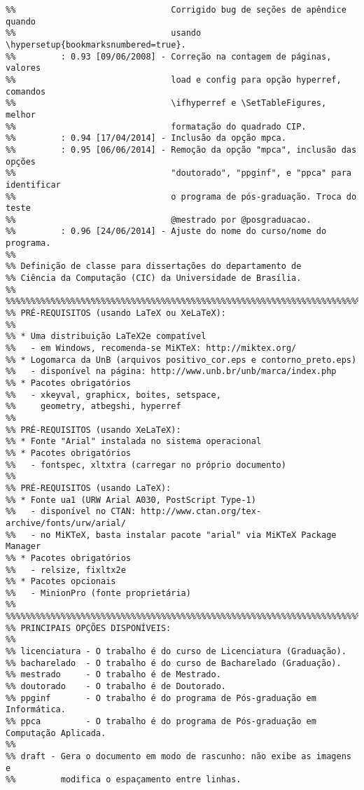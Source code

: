 \begin{verbatim}
%%                               Corrigido bug de seções de apêndice quando
%%                               usando \hypersetup{bookmarksnumbered=true}.
%%         : 0.93 [09/06/2008] - Correção na contagem de páginas, valores
%%                               load e config para opção hyperref, comandos
%%                               \ifhyperref e \SetTableFigures, melhor
%%                               formatação do quadrado CIP. 
%%         : 0.94 [17/04/2014] - Inclusão da opção mpca. 
%%         : 0.95 [06/06/2014] - Remoção da opção "mpca", inclusão das opções
%%                               "doutorado", "ppginf", e "ppca" para identificar
%%                               o programa de pós-graduação. Troca do teste 
%%                               @mestrado por @posgraduacao.
%%         : 0.96 [24/06/2014] - Ajuste do nome do curso/nome do programa.
%%
%% Definição de classe para dissertações do departamento de
%% Ciência da Computação (CIC) da Universidade de Brasília.
%%
%%%%%%%%%%%%%%%%%%%%%%%%%%%%%%%%%%%%%%%%%%%%%%%%%%%%%%%%%%%%%%%%%%%%%%%%%%%%%%%
%% PRÉ-REQUISITOS (usando LaTeX ou XeLaTeX):
%%
%% * Uma distribuição LaTeX2e compatível
%%   - em Windows, recomenda-se MiKTeX: http://miktex.org/
%% * Logomarca da UnB (arquivos positivo_cor.eps e contorno_preto.eps)
%%   - disponível na página: http://www.unb.br/unb/marca/index.php
%% * Pacotes obrigatórios
%%   - xkeyval, graphicx, boites, setspace,
%%     geometry, atbegshi, hyperref
%%
%% PRÉ-REQUISITOS (usando XeLaTeX):
%% * Fonte "Arial" instalada no sistema operacional
%% * Pacotes obrigatórios
%%   - fontspec, xltxtra (carregar no próprio documento)
%%
%% PRÉ-REQUISITOS (usando LaTeX):
%% * Fonte ua1 (URW Arial A030, PostScript Type-1)
%%   - disponível no CTAN: http://www.ctan.org/tex-archive/fonts/urw/arial/
%%   - no MiKTeX, basta instalar pacote "arial" via MiKTeX Package Manager
%% * Pacotes obrigatórios
%%   - relsize, fixltx2e
%% * Pacotes opcionais
%%   - MinionPro (fonte proprietária)
%%
%%%%%%%%%%%%%%%%%%%%%%%%%%%%%%%%%%%%%%%%%%%%%%%%%%%%%%%%%%%%%%%%%%%%%%%%%%%%%%%
%% PRINCIPAIS OPÇÕES DISPONÍVEIS:
%%
%% licenciatura - O trabalho é do curso de Licenciatura (Graduação).
%% bacharelado  - O trabalho é do curso de Bacharelado (Graduação).
%% mestrado     - O trabalho é de Mestrado.
%% doutorado    - O trabalho é de Doutorado.
%% ppginf       - O trabalho é do programa de Pós-graduação em Informática.
%% ppca         - O trabalho é do programa de Pós-graduação em Computação Aplicada.
%%
%% draft - Gera o documento em modo de rascunho: não exibe as imagens e
%%         modifica o espaçamento entre linhas.

\end{verbatim}
